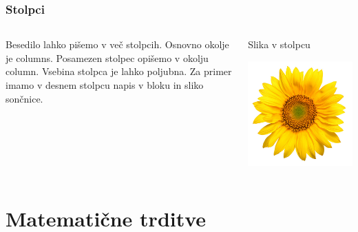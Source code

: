 \documentclass{beamer}
\begin{document}
\begin{frame}
   \frametitle{Stolpci}


   \begin{columns}
      \begin{column}{0.5\textwidth}
         Besedilo lahko pišemo v več stolpcih.
         Osnovno okolje je columns.
         Posamezen stolpec opišemo v okolju column.
         Vsebina stolpca je lahko poljubna.
         Za primer imamo v desnem stolpcu napis v bloku in sliko sončnice.
      \end{column}

      \begin{column}{0.5\textwidth}
         \begin{block}{}
            Slika v stolpcu
         \end{block}

         \includegraphics[width=\textwidth]{soncnica.jpg}
      \end{column}
   \end{columns}
\end{frame}


\section{Matematične trditve}
\end{document}
